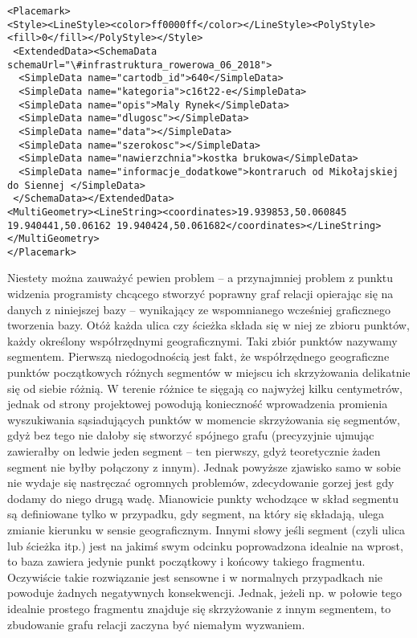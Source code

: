 \lstset{language=XML, breaklines=true}
\begin{lstlisting}
<Placemark>
<Style><LineStyle><color>ff0000ff</color></LineStyle><PolyStyle><fill>0</fill></PolyStyle></Style>
 <ExtendedData><SchemaData schemaUrl="\#infrastruktura_rowerowa_06_2018">
  <SimpleData name="cartodb_id">640</SimpleData>
  <SimpleData name="kategoria">c16t22-e</SimpleData>
  <SimpleData name="opis">Maly Rynek</SimpleData>
  <SimpleData name="dlugosc"></SimpleData>
  <SimpleData name="data"></SimpleData>
  <SimpleData name="szerokosc"></SimpleData>
  <SimpleData name="nawierzchnia">kostka brukowa</SimpleData>
  <SimpleData name="informacje_dodatkowe">kontraruch od Mikołajskiej do Siennej </SimpleData>
 </SchemaData></ExtendedData>
<MultiGeometry><LineString><coordinates>19.939853,50.060845 19.940441,50.06162 19.940424,50.061682</coordinates></LineString></MultiGeometry>
</Placemark>
\end{lstlisting}

Niestety można zauważyć pewien problem – a przynajmniej problem z punktu widzenia programisty chcącego stworzyć poprawny graf relacji opierając się na danych z niniejszej bazy – wynikający ze wspomnianego wcześniej graficznego tworzenia bazy. Otóż każda ulica czy ścieżka składa się w niej ze zbioru punktów, każdy określony współrzędnymi geograficznymi. Taki zbiór punktów nazywamy segmentem. Pierwszą niedogodnością jest fakt, że współrzędnego geograficzne punktów początkowych różnych segmentów w miejscu ich skrzyżowania delikatnie się od siebie różnią. W terenie różnice te sięgają co najwyżej kilku centymetrów, jednak od strony projektowej powodują konieczność wprowadzenia promienia wyszukiwania sąsiadujących punktów w momencie skrzyżowania się segmentów, gdyż bez tego nie dałoby się stworzyć spójnego grafu (precyzyjnie ujmując zawierałby on ledwie jeden segment – ten pierwszy, gdyż teoretycznie żaden segment nie byłby połączony z innym). Jednak powyższe zjawisko samo w sobie nie wydaje się nastręczać ogromnych problemów, zdecydowanie gorzej jest gdy dodamy do niego drugą wadę. Mianowicie punkty wchodzące w skład segmentu są definiowane tylko w przypadku, gdy segment, na który się składają, ulega zmianie kierunku w sensie geograficznym. Innymi słowy jeśli segment (czyli ulica lub ścieżka itp.) jest na jakimś swym odcinku poprowadzona idealnie na wprost, to baza zawiera jedynie punkt początkowy i końcowy takiego fragmentu. Oczywiście takie rozwiązanie jest sensowne i w normalnych przypadkach nie powoduje żadnych negatywnych konsekwencji. Jednak, jeżeli np. w połowie tego idealnie prostego fragmentu znajduje się skrzyżowanie z innym segmentem, to zbudowanie grafu relacji zaczyna być niemałym wyzwaniem. 

